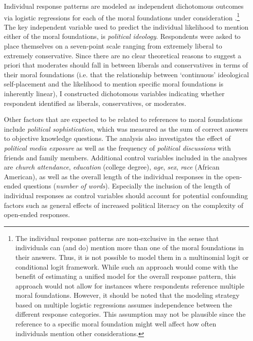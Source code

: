 \documentclass[12pt]{article}
\begin{document}
Individual response patterns are modeled as independent dichotomous outcomes via logistic regressions for each of the moral foundations under consideration \citep[c.f. for example][]{agresti1999modeling}.\footnote{The individual response patterns are non-exclusive in the sense that individuals can (and do) mention more than one of the moral foundations in their answers. Thus, it is not possible to model them in a multinomial logit or conditional logit framework. While such an approach would come with the benefit of estimating a unified model for the overall response pattern, this approach would not allow for instances where respondents reference multiple moral foundations. However, it should be noted that the modeling strategy based on multiple logistic regressions assumes independence between the different response categories. This assumption may not be plausible since the reference to a specific moral foundation might well affect how often individuals mention other considerations.} The key independent variable used to predict the individual likelihood to mention either of the moral foundations, is \textit{political ideology}. Respondents were asked to place themselves on a seven-point scale ranging from extremely liberal to extremely conservative. Since there are no clear theoretical reasons to suggest a priori that moderates should fall in between liberals and conservatives in terms of their moral foundations (i.e. that the relationship between `continuous' ideological self-placement and the likelihood to mention specific moral foundations is inherently linear), I constructed dichotomous variables indicating whether respondent identified as liberals, conservatives, or moderates.

Other factors that are expected to be related to references to moral foundations include \textit{political sophistication}, which was measured as the sum of correct answers to objective knowledge questions. The analysis also investigates the effect of \textit{political media exposure} as well as the frequency of \textit{political discussions} with friends and family members. Additional control variables included in the analyses are \textit{church attendance}, \textit{education} (college degree), \textit{age}, \textit{sex}, \textit{race} (African American), as well as the overall length of the individual responses in the open-ended questions (\textit{number of words}). Especially the inclusion of the length of individual responses as control variables should account for potential confounding factors such as general effects of increased political literacy on the complexity of open-ended responses.
\end{document}
